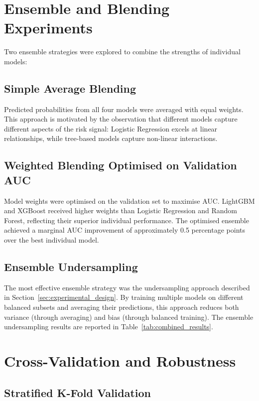 \section{Ensemble and Blending Experiments}
\label{sec:ensemble}

Two ensemble strategies were explored to combine the strengths of individual models:

\subsection{Simple Average Blending}

Predicted probabilities from all four models were averaged with equal weights. This approach is motivated by the observation that different models capture different aspects of the risk signal: Logistic Regression excels at linear relationships, while tree-based models capture non-linear interactions.

\subsection{Weighted Blending Optimised on Validation AUC}

Model weights were optimised on the validation set to maximise AUC. LightGBM and XGBoost received higher weights than Logistic Regression and Random Forest, reflecting their superior individual performance. The optimised ensemble achieved a marginal AUC improvement of approximately 0.5 percentage points over the best individual model.

\subsection{Ensemble Undersampling}

The most effective ensemble strategy was the undersampling approach described in Section~\ref{sec:experimental_design}. By training multiple models on different balanced subsets and averaging their predictions, this approach reduces both variance (through averaging) and bias (through balanced training). The ensemble undersampling results are reported in Table~\ref{tab:combined_results}.

\section{Cross-Validation and Robustness}
\label{sec:cross_validation}

\subsection{Stratified K-Fold Validation}

